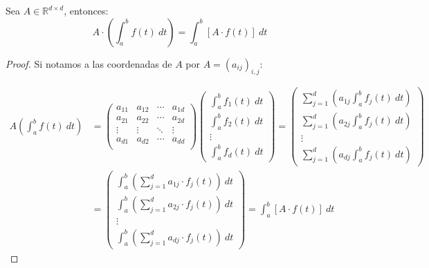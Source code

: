 \begin{prop}
    Sea $A\in \mathbb{R}^{d\times d}$, entonces:
    \begin{equation*}
        A\cdot \left(\int_{a}^{b} f(t)~dt \right) = \int_{a}^{b} [A\cdot f(t)]~dt
    \end{equation*}
    \begin{proof}
        Si notamos a las coordenadas de $A$ por $A={(a_{ij})}_{i,j}$:

        \begin{align*}
            A \left(\int_{a}^{b} f(t)~dt \right) &= 
            \left(\begin{array}{cccc}
                a_{11} & a_{12} & \cdots & a_{1d} \\
                a_{21} & a_{22} & \cdots & a_{2d} \\
                \vdots & \vdots & \ddots & \vdots \\
                a_{d1} & a_{d2} & \cdots & a_{dd} \\
            \end{array}\right) 
            \left(\begin{array}{c}
                \displaystyle\int_{a}^{b} f_1(t)~dt  \\
                \displaystyle\int_{a}^{b} f_2(t)~dt  \\
                \vdots \\
                \displaystyle\int_{a}^{b} f_d(t)~dt  
            \end{array}\right) = \left(\begin{array}{c}
                \displaystyle\sum_{j=1}^{d} \left(a_{1j}  \int_{a}^{b} f_{j}(t)~dt \right) \\
                \displaystyle\sum_{j=1}^{d} \left(a_{2j}  \int_{a}^{b} f_{j}(t)~dt \right) \\
                \vdots \\
                \displaystyle\sum_{j=1}^{d} \left(a_{dj}  \int_{a}^{b} f_{j}(t)~dt \right) 
            \end{array}\right) \\
                 &= \left(\begin{array}{c}
                     \displaystyle \int_{a}^{b} \left(\sum_{j=1}^{d}a_{1j} \cdot f_j(t)\right)~dt  \\
                     \displaystyle \int_{a}^{b} \left(\sum_{j=1}^{d}a_{2j} \cdot f_j(t)\right)~dt  \\
                     \vdots \\
                     \displaystyle \int_{a}^{b} \left(\sum_{j=1}^{d}a_{dj} \cdot f_j(t)\right)~dt  
             \end{array}\right) = \int_{a}^{b} [A\cdot f(t)]~dt 
        \end{align*}

    \end{proof}
\end{prop}

